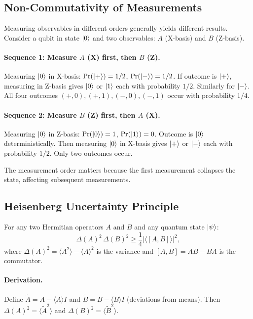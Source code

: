\documentclass[10pt,a4paper]{article}
\begin{document}
\subsection{Non-Commutativity of Measurements}

Measuring observables in different orders generally yields different results. Consider a qubit in state $\ket{0}$ and two observables: $A$ (X-basis) and $B$ (Z-basis).

\paragraph{Sequence 1: Measure $A$ (X) first, then $B$ (Z).}
Measuring $\ket{0}$ in X-basis: $\Pr(\ket{+})=1/2$, $\Pr(\ket{-})=1/2$. If outcome is $\ket{+}$, measuring in Z-basis gives $\ket{0}$ or $\ket{1}$ each with probability $1/2$. Similarly for $\ket{-}$. All four outcomes $(+,0),(+,1),(-,0),(-,1)$ occur with probability $1/4$.

\paragraph{Sequence 2: Measure $B$ (Z) first, then $A$ (X).}
Measuring $\ket{0}$ in Z-basis: $\Pr(\ket{0})=1$, $\Pr(\ket{1})=0$. Outcome is $\ket{0}$ deterministically. Then measuring $\ket{0}$ in X-basis gives $\ket{+}$ or $\ket{-}$ each with probability $1/2$. Only two outcomes occur.

The measurement order matters because the first measurement collapses the state, affecting subsequent measurements.

\subsection{Heisenberg Uncertainty Principle}

\begin{tcolorbox}[propstyle, title={Theorem: Heisenberg Uncertainty Principle}]
For any two Hermitian operators $A$ and $B$ and any quantum state $\ket{\psi}$:
\[
\Delta(A)^2\,\Delta(B)^2 \ge \frac{1}{4}|\langle[A,B]\rangle|^2,
\]
where $\Delta(A)^2=\langle A^2\rangle - \langle A\rangle^2$ is the variance and $[A,B]=AB-BA$ is the commutator.
\end{tcolorbox}

\paragraph{Derivation.} Define $\tilde{A}=A-\langle A\rangle I$ and $\tilde{B}=B-\langle B\rangle I$ (deviations from means). Then $\Delta(A)^2=\langle\tilde{A}^2\rangle$ and $\Delta(B)^2=\langle\tilde{B}^2\rangle$.
\end{document}
